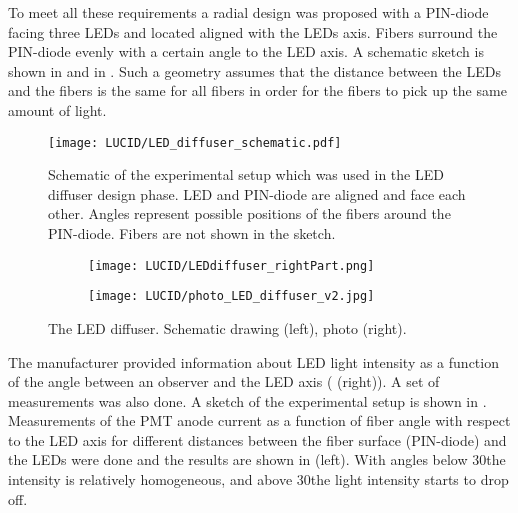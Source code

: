 To meet all these requirements a radial design was proposed with a PIN-diode facing three LEDs and located aligned with the LEDs axis. Fibers surround the PIN-diode 
evenly with a certain angle to the LED axis. A schematic sketch is shown in  and in .
Such a geometry assumes that the distance between the LEDs and the fibers is the same for all fibers in order for 
the fibers to pick up the same amount of light.
  
\begin{figure}
\centering
\texttt{[image: LUCID/LED\_diffuser\_schematic.pdf]}
\caption{Schematic of the experimental setup which was used in the LED diffuser design phase. LED and PIN-diode are aligned and face each other. 
	 Angles represent possible positions of the fibers around the PIN-diode. Fibers are not shown in the sketch.}
\label{fig:AngularMeasurementSetup}
\end{figure}

\begin{figure}
\begin{subfigure}{.48\textwidth}
  \centering
  \texttt{[image: LUCID/LEDdiffuser\_rightPart.png]}
\end{subfigure}
\begin{subfigure}{.48\textwidth}
  \centering
  \texttt{[image: LUCID/photo\_LED\_diffuser\_v2.jpg]}
\end{subfigure}

\caption{The LED diffuser. Schematic drawing (left), photo (right).}
\label{fig:LEDDiffuser}
\end{figure}
  


The manufacturer provided information about LED light intensity as a function of the angle between an observer and the LED axis 
( (right)).
A set of measurements was also done.
A sketch of the experimental setup is shown in .
Measurements of the PMT anode current as a function of fiber angle with respect to the LED axis for different distances between 
the fiber surface (PIN-diode) and the LEDs were done and the results are shown in  (left).
With angles below 30\degree the intensity is relatively homogeneous, and above 30\degree the light intensity starts to drop off.

